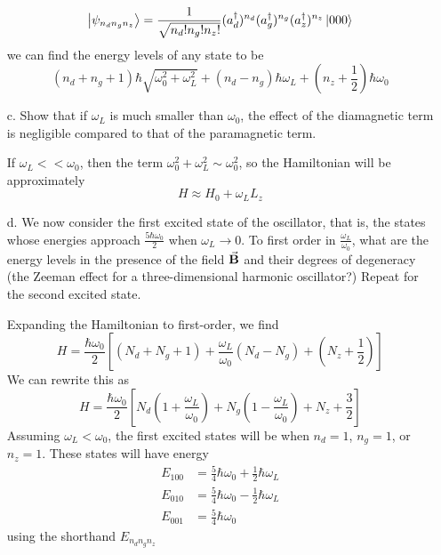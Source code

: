 \documentclass[a4paper,twoside]{article}
\begin{document}
\begin{itemize}
\begin{problem}
\begin{equation}
                \ket{\psi_{n_d n_g n_z}} = \frac{1}{\sqrt{n_d! n_g! n_z !}} (a_d^\dagger)^{n_d} (a_g^\dagger)^{n_g} (a_z^\dagger)^{n_z}\ket{000}
            \end{equation}
            we can find the energy levels of any state to be
            \begin{equation}
                (n_d + n_g + 1) \hbar \sqrt{\omega_0^2 + \omega_L^2} + (n_d - n_g) \hbar \omega_L + \left( n_z + \frac{1}{2} \right) \hbar \omega_0
            \end{equation}
        \end{problem}
    \item[c.] Show that if $ \omega_L $ is much smaller than $ \omega_0 $, the effect of the diamagnetic term is negligible compared to that of the paramagnetic term.
        \begin{problem}
            If $ \omega_L << \omega_0 $, then the term $ \omega_0^2 + \omega_L^2 \sim \omega_0^2 $, so the Hamiltonian will be approximately
            \begin{equation}
                H \approx H_0 + \omega_L L_z
            \end{equation}
        \end{problem}
    \item[d.] We now consider the first excited state of the oscillator, that is, the states whose energies approach $ \frac{5 \hbar \omega_0}{2} $ when $ \omega_L \to 0 $. To first order in $ \frac{\omega_L}{\omega_0} $, what are the energy levels in the presence of the field $ \va{B} $ and their degrees of degeneracy (the Zeeman effect for a three-dimensional harmonic oscillator?) Repeat for the second excited state.
        \begin{problem}
            Expanding the Hamiltonian to first-order, we find
            \begin{equation}
                H = \frac{\hbar \omega_0}{2} \left[ (N_d + N_g + 1) + \frac{\omega_L}{\omega_0} (N_d - N_g) + \left( N_z + \frac{1}{2} \right) \right]
            \end{equation}
            We can rewrite this as
            \begin{equation}
                H = \frac{\hbar \omega_0}{2} \left[ N_d \left( 1 + \frac{\omega_L}{\omega_0} \right) + N_g \left( 1 - \frac{\omega_L}{\omega_0} \right) + N_z + \frac{3}{2} \right]
            \end{equation}
            Assuming $ \omega_L < \omega_0 $, the first excited states will be when $ n_d = 1 $, $ n_g = 1 $, or $ n_z = 1 $. These states will have energy
            \begin{align}
                E_{100} &= \frac{5}{4} \hbar \omega_0 + \frac{1}{2} \hbar \omega_L \\
                E_{010} &= \frac{5}{4} \hbar \omega_0 - \frac{1}{2} \hbar \omega_L \\
                E_{001} &= \frac{5}{4} \hbar \omega_0
            \end{align}
            using the shorthand $ E_{n_d n_g n_z} $


\end{problem}
\end{itemize}
\end{document}
